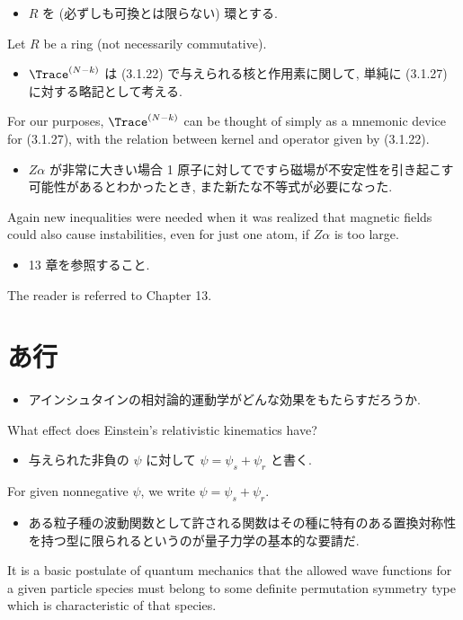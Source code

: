 \documentclass[openany, a4paper, oneside]{jsbook}
\begin{document}
\begin{itemize}
\item $R$ を (必ずしも可換とは限らない) 環とする.
\end{itemize}
Let $R$ be a ring (not necessarily commutative).

\begin{itemize}
\item $\Trace^{(N-k)}$ は (3.1.22) で与えられる核と作用素に関して, 単純に (3.1.27) に対する略記として考える. \cite{LiebSeiringer1}
\end{itemize}
For our purposes, $\Trace^{(N-k)}$ can be thought of simply as a mnemonic device for (3.1.27),
with the relation between kernel and operator given by (3.1.22).

\begin{itemize}
\item $Z \alpha$ が非常に大きい場合 1 原子に対してですら磁場が不安定性を引き起こす可能性があるとわかったとき, また新たな不等式が必要になった. \cite{LiebSeiringer1}
\end{itemize}
Again new inequalities were needed when it was realized that magnetic fields
could also cause instabilities, even for just one atom, if $Z \alpha$ is too large.

\begin{itemize}
\item 13 章を参照すること. \cite{LiebSeiringer1}
\end{itemize}
The reader is referred to Chapter 13.
\section{あ行}

\begin{itemize}
\item アインシュタインの相対論的運動学がどんな効果をもたらすだろうか. \cite{LiebSeiringer1}
\end{itemize}
What effect does Einstein's relativistic kinematics have?

\begin{itemize}
\item 与えられた非負の $\psi$ に対して $\psi = \psi_{s} + \psi_{r}$ と書く. \cite{LiebSeiringer1}
\end{itemize}
For given nonnegative $\psi$, we write $\psi = \psi_{s} + \psi_{r}$.

\begin{itemize}
\item ある粒子種の波動関数として許される関数はその種に特有のある置換対称性を持つ型に限られるというのが量子力学の基本的な要請だ. \cite{LiebSeiringer1}
\end{itemize}
It is a basic postulate of quantum mechanics that the allowed wave functions for a given particle species
must belong to some definite permutation symmetry type which is characteristic of that species.
\end{document}
